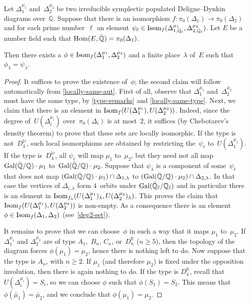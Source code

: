 \documentclass[10pt,twoside,leqno]{article}
\numberwithin{equation}{subsection}
\newcommand{\Hom}{\textnormal{Hom}}
\newcommand{\Isom}{\textnormal{Isom}}
\newcommand{\QQ}{\mathbb{Q}}
\newcommand{\QQbar}{\bar{\QQ}}
\newcommand{\QQl}{\QQ_{\ell}}
\newcommand{\QQlbar}{\QQbar_{\ell}}
\newcommand{\RR}{\mathbb{R}}
\newcommand{\HQ}{\mathbb{H}}
\newcommand{\Gal}{\textnormal{Gal}}
\begin{document}
\begin{proposition} %
 \label{deldyn-local-global}
 Let $\Delta_1^{\mu_1}$ and~$\Delta_2^{\mu_2}$ be two
 irreducible symplectic populated Deligne--Dynkin diagrams over~$\QQ$.
 Suppose that there is an isomorphism
 $f \colon \pi_0(\Delta_1) \to \pi_0(\Delta_2)$
 and for each prime number~$\ell$ an element
 $\psi_\ell \in \Isom_f(\Delta_{1,\QQl}^{\mu_1},\Delta_{2,\QQl}^{\mu_2})$.
 Let $E$ be a number field such that $\Hom(E,\QQbar) = \pi_0(\Delta_1)$.

 Then there exists a $\phi \in \Isom_f(\Delta_1^{\mu_1},\Delta_2^{\mu_2})$
 and a finite place~$\lambda$ of~$E$
 such that $\phi_\lambda = \psi_\lambda$.
 \begin{proof}
  It suffices to prove the existence of~$\phi$;
  the second claim will follow automatically from \cref{locally-same-aut}.
  First of all, observe that $\Delta_1^{\mu_1}$ and~$\Delta_2^{\mu_2}$
  must have the same type, by \cref{type-remarks} and \cref{locally-same-type}.
  Next, we claim that there is an element in
  $\Isom_f(U(\Delta_1^{\mu_1}),U(\Delta_2^{\mu_2}))$.
  Indeed, since the degree of~$U(\Delta_i^{\mu_i})$ over~$\pi_0(\Delta_i)$
  is at most~$2$,
  it suffices (by Chebotarev's density theorem)
  to prove that these sets are locally isomorphic.
  If the type is not~$D_4^\HQ$,
  such local isomorphisms are obtained
  by restricting the~$\psi_\ell$ to~$U(\Delta_1^{\mu_1})$.
  If the type is~$D_4^\HQ$,
  all $\psi_\ell$ will map $\mu_1$ to~$\mu_2$,
  but they need not all map $\Gal(\QQbar/\QQ)\cdot\mu_1$
  to~$\Gal(\QQbar/\QQ)\cdot\mu_2$.
  Suppose that $\psi_\lambda$ is a component of some~$\psi_\ell$
  that does not map $(\Gal(\QQbar/\QQ)\cdot\mu_1) \cap \Delta_{1,\lambda}$
  to $(\Gal(\QQbar/\QQ)\cdot\mu_2) \cap \Delta_{2,\lambda}$.
  In that case the vertices of $\Delta_{i,\lambda}$
  form $4$~orbits under $\Gal(\QQlbar/\QQl)$
  and in particular there is an element in
  $\Isom_{f_\lambda}(U(\Delta_1^{\mu_1})_{\lambda},
  U(\Delta_2^{\mu_2})_{\lambda})$.
  This proves the claim that
  $\Isom_f(U(\Delta_1^{\mu_1}),U(\Delta_2^{\mu_2}))$ is non-empty.
  As a consequence there is an element
  $\phi \in \Isom_f(\Delta_1, \Delta_2)$ (see~\cref{deg2-set}).

  It remains to prove that we can choose~$\phi$
  in such a way that it maps $\mu_1$ to~$\mu_2$.
  If $\Delta_1^{\mu_1}$ and $\Delta_2^{\mu_2}$
  are of type $A_1$,~$B_n$, $C_n$, or~$D_n^\RR$ ($n \ge 5$),
  then the topology of the diagram forces $\phi(\mu_1) = \mu_2$,
  hence there is nothing left to do.
  Now suppose that the type is $A_n$, with $n \ge 2$.
  If $\mu_1$ (and therefore $\mu_2$) is fixed
  under the opposition involution,
  then there is again nothing to do.
  If the type is $D_4^\RR$,
  recall that $U(\Delta_i^{\mu_i}) = S_i$,
  so we can choose $\phi$ such that $\phi(S_1) = S_2$.
  This means that $\phi(\bar\mu_1) = \bar\mu_2$,
  and we conclude that $\phi(\mu_1) = \mu_2$.


\end{proof}
\end{proposition}
\end{document}
